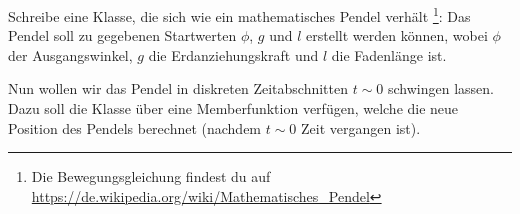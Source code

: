 \begin{aufg_schw}
  Schreibe eine Klasse, die sich wie ein mathematisches Pendel verhält%
  \footnote{Die Bewegungsgleichung findest du auf \url{https://de.wikipedia.org/wiki/Mathematisches_Pendel}}:
  Das Pendel soll zu gegebenen Startwerten $\phi$, $g$ und $l$ erstellt werden können,
  wobei $\phi$ der Ausgangswinkel, $g$ die Erdanziehungskraft und $l$ die Fadenlänge ist.
  
  Nun wollen wir das Pendel in diskreten Zeitabschnitten $t \sim 0$ schwingen lassen.
  Dazu soll die Klasse über eine Memberfunktion  verfügen, welche die neue Position des Pendels berechnet (nachdem $t \sim 0$ Zeit vergangen ist).
\end{aufg_schw}
